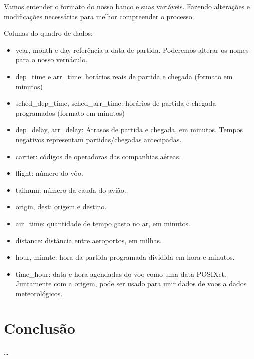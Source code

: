 \documentclass[]{book}
\newenvironment{Shaded}{\begin{snugshade}}{\end{snugshade}}
\newcommand{\DataTypeTok}[1]{\textcolor[rgb]{0.13,0.29,0.53}{#1}}
\newcommand{\KeywordTok}[1]{\textcolor[rgb]{0.13,0.29,0.53}{\textbf{#1}}}
\newcommand{\NormalTok}[1]{#1}
\newcommand{\OperatorTok}[1]{\textcolor[rgb]{0.81,0.36,0.00}{\textbf{#1}}}
\newcommand{\StringTok}[1]{\textcolor[rgb]{0.31,0.60,0.02}{#1}}
\begin{document}
Vamos entender o formato do nosso banco e suas variáveis. Fazendo alterações e modificações necessárias para melhor compreender o processo.

Colunas do quadro de dados:

\begin{itemize}
\item
  year, month e day referência a data de partida. Poderemos alterar os nomes para o nosso vernáculo.
\item
  dep\_time e arr\_time: horários reais de partida e chegada (formato em minutos)
\item
  sched\_dep\_time, sched\_arr\_time: horários de partida e chegada programados (formato em minutos)
\item
  dep\_delay, arr\_delay: Atrasos de partida e chegada, em minutos. Tempos negativos representam partidas/chegadas antecipadas.
\item
  carrier: códigos de operadoras das companhias aéreas.
\item
  flight: número do vôo.
\item
  tailnum: número da cauda do avião.
\item
  origin, dest: origem e destino.
\item
  air\_time: quantidade de tempo gasto no ar, em minutos.
\item
  distance: distância entre aeroportos, em milhas.
\item
  hour, minute: hora da partida programada dividida em hora e minutos.
\item
  time\_hour: data e hora agendadas do voo como uma data POSIXct. Juntamente com a origem, pode ser usado para unir dados de voos a dados meteorológicos.
\end{itemize}

\begin{Shaded}
\end{Shaded}

\hypertarget{summary}{%
\chapter{Conclusão}\label{summary}}

\ldots{}
\end{document}
